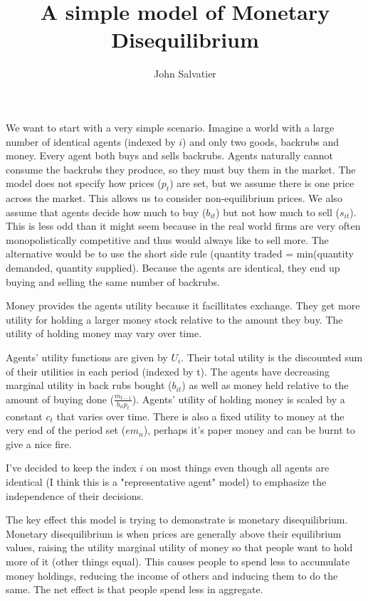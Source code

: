 \documentclass[14pt]{article} \usepackage{amsmath}
\title{A simple model of Monetary Disequilibrium}
\author{John Salvatier}
\begin{document}
\maketitle

We want to start with a very simple scenario. Imagine a world with a large number of identical agents (indexed by $i$) and only two goods, backrubs and money. Every agent both buys and sells backrubs. Agents naturally cannot consume the backrubs they produce, so they must buy them in the market. The model does not specify how prices ($p_t$) are set, but we assume there is one price across the market. This allows us to consider non-equilibrium prices. We also assume that agents decide how much to buy ($b_{it}$) but not how much to sell ($s_{it}$). This is less odd than it might seem because in the real world firms are very often monopolistically competitive and thus would always like to sell more. The alternative would be to use the short side rule (quantity traded = min(quantity demanded, quantity supplied). Because the agents are identical, they end up buying and selling the same number of backrubs.

Money provides the agents utility because it facillitates exchange. They get more utility for holding a larger money stock relative to the amount they buy. The utility of holding money may vary over time.

Agents' utility functions are given by $U_i$. Their total utility is the discounted sum of their utilities in each period (indexed by t). The agents have decreasing marginal utility in back rubs bought ($b_{it}$) as well as money held relative to the amount of buying done ($\frac{m_{t-1}}{b_{it} p_t}$). Agents' utility of holding money is scaled by a constant $c_t$ that varies over time.  There is also a fixed utility to money at the very end of the period set ($e m_n$), perhaps it's paper money and can be burnt to give a nice fire.

I've decided to keep the index $i$ on most things even though all agents are identical (I think this is a "representative agent" model) to emphasize the independence of their decisions. 

The key effect this model is trying to demonstrate is monetary disequilibrium. 
Monetary disequilibrium is when prices are generally above their equilibrium values, raising the utility marginal utility of money so that people want to hold more of it (other things equal). 
This causes people to spend less to accumulate money holdings, reducing the income of others and inducing them to do the same.
The net effect is that people spend less in aggregate.
\end{document}
